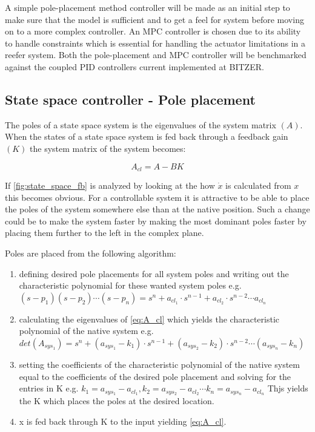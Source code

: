 A simple pole-placement method controller will be made as an initial step to make sure that the model is sufficient and to get a feel for system before moving on to a more complex controller. An MPC controller is chosen due to its ability to handle constraints which is essential for handling the actuator limitations in a reefer system. Both the pole-placement and MPC controller will be benchmarked against the coupled PID controllers current implemented at BITZER.


\subsection{State space controller - Pole placement}
The poles of a state space system is the eigenvalues of the system matrix $(A)$. When the states of a state space system is fed back through a feedback gain $(K)$ the system matrix of the system becomes:

\begin{equation} \label{eq:A_cl}
	A_{cl} = A-BK
\end{equation}

If \cref{fig:state_space_fb} is analyzed by looking at the how $\dot{x}$ is calculated from $x$ this becomes obvious. For a controllable system it is attractive to be able to place the poles of the system somewhere else than at the native position. Such a change could be to make the system faster by making the most dominant poles faster by placing them further to the left in the complex plane.

Poles are placed from the following algorithm:
\begin{enumerate}
	\item defining desired pole placements for all system poles and writing out the characteristic polynomial for these wanted system poles e.g.
	$(s-p_1)(s-p_2) \cdots (s-p_n) = s^n + a_{cl_1} \cdot s^{n-1} + a_{cl_2} \cdot s^{n-2} \cdots a_{cl_n}$
	\item calculating the eigenvalues of \cref{eq:A_cl} which yields the characteristic polynomial of the native system e.g.
	$det(A_{sys_1}) = s^n + (a_{sys_1}-k_1) \cdot s^{n-1} + (a_{sys_2}-k_2) \cdot s^{n-2} \cdots (a_{sys_n}-k_n)$
	\item setting the coefficients of the characteristic polynomial of the native system equal to the coefficients of the desired pole placement and solving for the entries in K e.g.
	$ k_1 = a_{sys_1}-a_{cl_1}, k_2 = a_{sys_2}-a_{cl_2} \cdots k_n = a_{sys_n}-a_{cl_n} $
	 Thjs yields the K which places the poles at the desired location.
	\item x is fed back through K to the input yielding \cref{eq:A_cl}.
\end{enumerate}

